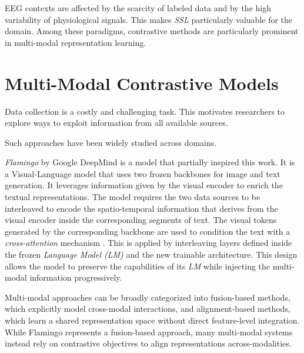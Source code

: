 EEG contexts are affected by the scarcity of labeled data and by the high variability of physiological signals.
This makes \textit{SSL} particularly valuable for the domain.
Among these paradigms, contrastive methods are particularly prominent in multi-modal representation learning.

\section{Multi-Modal Contrastive Models}
Data collection is a costly and challenging task.
This motivates researchers to explore ways to exploit information from all available sources.

Such approaches have been widely studied across domains.

\textit{Flamingo}\cite{alayrac2022flamingovisuallanguagemodel} by Google DeepMind is a model that partially inspired this work.
It is a Visual-Language model that uses two frozen backbones for image and text generation.
It leverages information given by the visual encoder to enrich the textual representations.
The model requires the two data sources to be interleaved to encode the spatio-temporal information that derives from the visual encoder inside the corresponding segments of text.
The visual tokens generated by the corresponding backbone are used to condition the text with a \textit{cross-attention} mechanism \cite{vaswani2023attentionneed}.
This is applied by interleaving layers defined inside the frozen \textit{Language Model (LM)} and the new trainable architecture.
This design allows the model to preserve the capabilities of its \textit{LM} while injecting the multi-modal information progressively.

Multi-modal approaches can be broadly categorized into fusion-based methods, which explicitly model cross-modal interactions, and alignment-based methods, which learn a shared representation space without direct feature-level integration.
While Flamingo represents a fusion-based approach, many multi-modal systems instead rely on contrastive objectives to align representations across-modalities.

